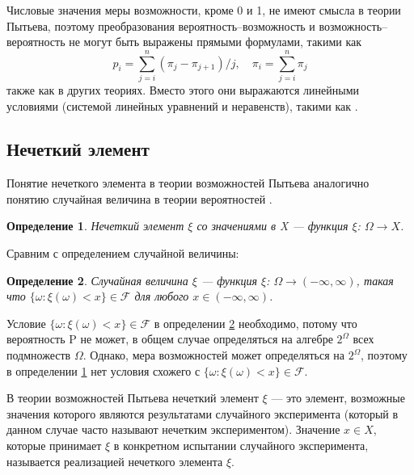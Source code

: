 \documentclass[a4paper, 14pt]{extarticle}
\newtheorem{definition}{Определение}
\begin{document}
Числовые значения меры возможности, кроме 0 и 1, не имеют смысла в теории Пытьева, поэтому преобразования вероятность–возможность и возможность–вероятность не могут быть выражены прямыми формулами, такими как
\begin{equation}
    p_i = \sum_{j = i}^n (\pi_j - \pi_{j+1}) / j, \quad \pi_i = \sum_{j = i}^n \pi_j
\end{equation}
также как в других теориях. Вместо этого они выражаются линейными условиями (системой линейных уравнений и неравенств), такими как \cite{dubois1980fuzzy}.

\subsection{Нечеткий элемент}
Понятие нечеткого элемента в теории возможностей Пытьева аналогично понятию случайная величина в теории вероятностей \cite{pytyev-poss_in_patrec-iii}. 
\begin{definition}
\label{101}
Нечеткий элемент $\xi$ со значениями в X --- функция $\xi$: $\Omega \to X$.
\end{definition}

Сравним с определением случайной величины:
\begin{definition}
\label{102}
Случайная величина $\xi$ --- функция $\xi$: $\Omega \to (-\infty, \infty)$, такая что $\{\omega: \xi(\omega) < x \} \in \mathcal{F}$ для любого $x \in (- \infty, \infty)$.
\end{definition}

Условие $\{\omega: \xi(\omega) < x \} \in \mathcal{F}$ в определении \ref{102} необходимо, потому что вероятность P не может, в общем случае определяться на алгебре $2^{\Omega}$ всех подмножеств $\Omega$.  Однако, мера возможностей может определяться на $2^{\Omega}$, поэтому в определении \ref{101} нет условия схожего с $\{\omega: \xi(\omega) < x \} \in \mathcal{F}$.

В теории возможностей Пытьева нечеткий элемент $\xi$ --- это элемент, возможные значения которого являются результатами случайного эксперимента (который в данном случае часто называют нечетким экспериментом). Значение $x \in X$, которые принимает $\xi$ в конкретном испытании случайного эксперимента, называется реализацией нечеткого элемента $\xi$.
\end{document}
